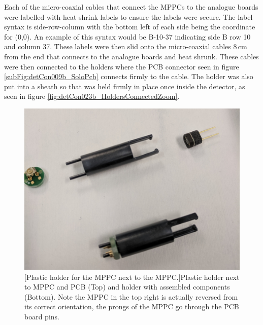 Each of the micro-coaxial cables that connect the MPPCs to the analogue boards were labelled with heat shrink labels to ensure the labels were secure. The label syntax is side-row-column with the bottom left of each side being the coordinate for (0,0). An example of this syntax would be B-10-37 indicating side B row 10 and column 37. These labels were then slid onto the micro-coaxial cables 8\,cm from the end that connects to the analogue boards and heat shrunk. These cables were then connected to the holders where the PCB connector seen in figure \ref{subFig:detCon009b_SoloPcb} connects firmly to the cable. The holder was also put into a sheath so that was held firmly in place once inside the detector, as seen in figure \ref{fig:detCon023b_HoldersConnectedZoom}.

\begin{figure}[!h]
\centering
\begin{minipage}{.45\textwidth}
  \centering
  \includegraphics[width=\linewidth]{Chapter3/Figs/Raster/detCon017b_HoldersWithParts.png}
  [Plastic holder for the MPPC next to the MPPC.]{Plastic holder next to MPPC and PCB (Top) and holder with assembled components (Bottom). Note the MPPC in the top right is actually reversed from its correct orientation, the prongs of the MPPC go through the PCB board pins.} 
  \label{fig:detCon017b_HoldersWithParts}
\end{minipage}%
\qquad
\begin{minipage}{.45\textwidth}
  \centering

\end{minipage}
\end{figure}
